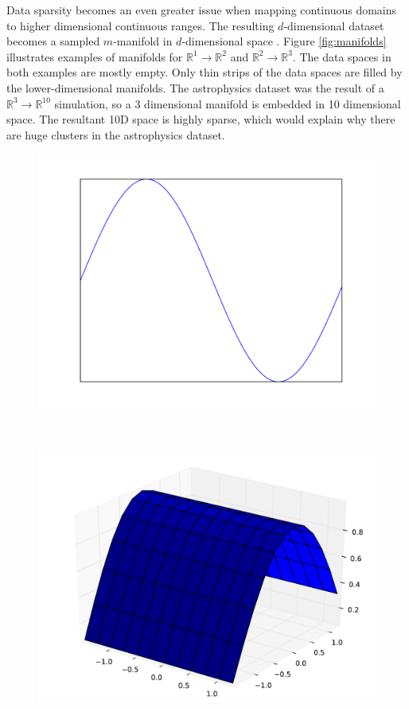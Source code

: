 Data sparsity becomes an even greater issue when mapping continuous domains to higher dimensional continuous ranges. The resulting $d$-dimensional dataset becomes a sampled $m$-manifold in $d$-dimensional space \cite{TODO}. Figure \ref{fig:manifolds} illustrates examples of manifolds for $\mathbb{R}^1 \rightarrow \mathbb{R}^2$ and $\mathbb{R}^2 \rightarrow \mathbb{R}^3$. The data spaces in both examples are mostly empty. Only thin strips of the data spaces are filled by the lower-dimensional manifolds. The astrophysics dataset was the result of a $\mathbb{R}^3 \rightarrow \mathbb{R}^{10}$ simulation, so a 3 dimensional manifold is embedded in 10 dimensional space. The resultant 10D space is highly sparse, which would explain why there are huge clusters in the astrophysics dataset.

\begin{figure}
	\begin{center}
		\begin{subfloat}{%
			\includegraphics[scale=0.2]{figures/1d_manifold.pdf}
		}
		\end{subfloat}~
		\begin{subfloat}{%
			\includegraphics[scale=0.225]{figures/2d_manifold.pdf}
		}
		\end{subfloat}
	\end{center}


\end{figure}
